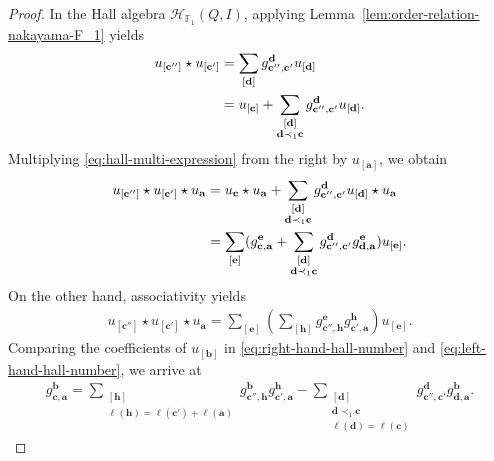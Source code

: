 \documentclass[12pt]{amsart}
\theoremstyle{remark}
\theoremstyle{definition}
\numberwithin{equation}{section}
\begin{document}
\begin{proof}
In the Hall algebra $\mathcal{H}_{\mathbb{F}_1}(Q,I)$, applying Lemma~\ref{lem:order-relation-nakayama-F_1} yields
\begin{align}\label{eq:hall-multi-expression}
    u_{[\mathbf{c}'']}\star u_{[\mathbf{c}']}&=\sum_{[\mathbf{d}]}g_{\mathbf{c}'',\mathbf{c}'}^\mathbf{d}u_{[\mathbf{d}]}\notag\\
    &=u_{[\mathbf{c}]}+\sum_{\substack{[\mathbf{d}] \\ \mathbf{d}\prec_1\mathbf{c}}} g_{\mathbf{c}'',\mathbf{c}'}^\mathbf{d} u_{[\mathbf{d}]}.
\end{align}
Multiplying \eqref{eq:hall-multi-expression} from the right by $u_{[\mathbf{a}]}$, we obtain
\begin{align}\label{eq:right-hand-hall-number}
    u_{[\mathbf{c}'']}\star u_{[\mathbf{c}']}\star u_{\mathbf{a}}&=u_{\mathbf{c}}\star u_{\mathbf{a}}+\sum_{\substack{[\mathbf{d}] \\ \mathbf{d}\prec_1\mathbf{c}}} g_{\mathbf{c}'',\mathbf{c}'}^\mathbf{d} u_{[\mathbf{d}]}\star u_{\mathbf{a}}\notag\\
    &=\sum_{[\mathbf{e}]}(g_{\mathbf{c},\mathbf{a}}^{\mathbf{e}}+\sum_{\substack{[\mathbf{d}] \\ \mathbf{d}\prec_1\mathbf{c}}} g_{\mathbf{c}'',\mathbf{c}'}^\mathbf{d}g_{\mathbf{d},\mathbf{a}}^{\mathbf{e}})u_{[\mathbf{e}]}.
\end{align}
On the other hand, associativity yields
\begin{align}\label{eq:left-hand-hall-number}
    u_{[\mathbf{c}'']}\star u_{[\mathbf{c}']}\star u_{\mathbf{a}}=\sum_{[\mathbf{e}]}(\sum_{[\mathbf{h}]}g_{\mathbf{c}'',\mathbf{h}}^{\mathbf{e}}g_{\mathbf{c}',\mathbf{a}}^{\mathbf{h}})u_{[\mathbf{e}]}.
\end{align}
Comparing the coefficients of $u_{[\mathbf{b}]}$ in \eqref{eq:right-hand-hall-number} and \eqref{eq:left-hand-hall-number}, we arrive at
\begin{align}\label{eq:recurse-in-F_1}
g_{\mathbf{c},\mathbf{a}}^{\mathbf{b}}=\sum_{\substack{[\mathbf{h}]\\ \ell(\mathbf{h})=\ell(\mathbf{c}')+\ell(\mathbf{a})}}g_{\mathbf{c}'',\mathbf{h}}^{\mathbf{b}}g_{\mathbf{c}',\mathbf{a}}^{\mathbf{h}}-\sum_{\substack{[\mathbf{d}] \\ \mathbf{d}\prec_1\mathbf{c}\\ \ell(\mathbf{d})=\ell(\mathbf{c})}} g_{\mathbf{c}'',\mathbf{c}'}^\mathbf{d}g_{\mathbf{d},\mathbf{a}}^{\mathbf{b}}.
\end{align}




\end{proof}
\end{document}
